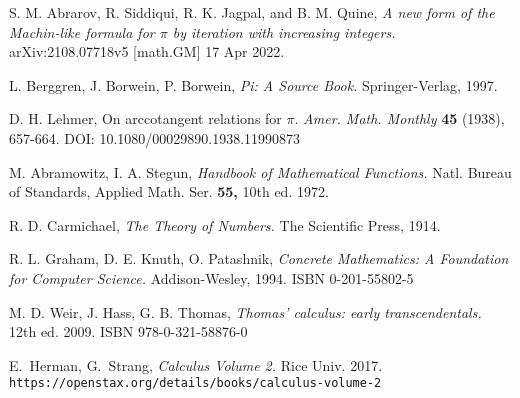 \documentclass[draft, 11pt]{article} %
\begin{document}
\begin{thebibliography}{999}

S. M. Abrarov, R. Siddiqui, R. K. Jagpal, and B. M. Quine,
{\it A new form of the Machin-like formula for $\pi$ by iteration with increasing integers.\/}
arXiv:2108.07718v5 [math.GM] 17 Apr 2022.

L. Berggren, J. Borwein, P. Borwein,
{\it Pi: A Source Book.\/}
Springer-Verlag, 1997.

D. H. Lehmer,
On arccotangent relations for $\pi$.
{\it Amer. Math. Monthly} {\bf 45}
(1938), 657-664. DOI: 10.1080/00029890.1938.11990873

M. Abramowitz, I. A. Stegun,
{\it Handbook of Mathematical Functions.\/}
Natl. Bureau of Standards, Applied Math. Ser. {\bf 55,} 10th ed. 1972.

R. D. Carmichael,
{\it The Theory of Numbers.\/}
The Scientific Press, 1914.

R. L. Graham, D. E. Knuth, O. Patashnik,
{\it Concrete Mathematics: A Foundation for Computer Science.\/}
Addison-Wesley, 1994.\hfill\break
ISBN 0-201-55802-5

M. D. Weir, J. Hass, G. B. Thomas,
{\it Thomas’ calculus: early transcendentals.\/} 12th ed. 2009.
ISBN 978-0-321-58876-0

E.~Herman, %
G.~Strang, %
{\it Calculus Volume 2.\/} Rice Univ. 2017.\hfill\break
{\tt https://openstax.org/details/books/calculus-volume-2}


\end{thebibliography}
\end{document}
